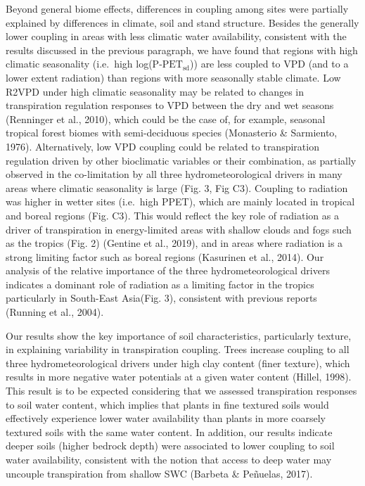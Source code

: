 \documentclass[11pt,twoside]{reedthesis}
\begin{document}
Beyond general biome effects, differences in coupling among sites were
partially explained by differences in climate, soil and stand structure.
Besides the generally lower coupling in areas with less climatic water
availability, consistent with the results discussed in the previous
paragraph, we have found that regions with high climatic seasonality
(i.e.~high log(\(\text{P-PET}_{\text{sd}}\))) are less coupled to VPD
(and to a lower extent radiation) than regions with more seasonally
stable climate. Low R2VPD under high climatic seasonality may be related
to changes in transpiration regulation responses to VPD between the dry
and wet seasons (Renninger et al., 2010), which could be the case of,
for example, seasonal tropical forest biomes with semi-deciduous species
(Monasterio \& Sarmiento, 1976). Alternatively, low VPD coupling could
be related to transpiration regulation driven by other bioclimatic
variables or their combination, as partially observed in the
co-limitation by all three hydrometeorological drivers in many areas
where climatic seasonality is large (Fig. 3, Fig C3). Coupling to
radiation was higher in wetter sites (i.e.~high PPET), which are mainly
located in tropical and boreal regions (Fig. C3). This would reflect the
key role of radiation as a driver of transpiration in energy-limited
areas with shallow clouds and fogs such as the tropics (Fig. 2) (Gentine
et al., 2019), and in areas where radiation is a strong limiting factor
such as boreal regions (Kasurinen et al., 2014). Our analysis of the
relative importance of the three hydrometeorological drivers indicates a
dominant role of radiation as a limiting factor in the tropics
particularly in South-East Asia(Fig. 3), consistent with previous
reports (Running et al., 2004).\par

Our results show the key importance of soil characteristics,
particularly texture, in explaining variability in transpiration
coupling. Trees increase coupling to all three hydrometeorological
drivers under high clay content (finer texture), which results in more
negative water potentials at a given water content (Hillel, 1998). This
result is to be expected considering that we assessed transpiration
responses to soil water content, which implies that plants in fine
textured soils would effectively experience lower water availability
than plants in more coarsely textured soils with the same water content.
In addition, our results indicate deeper soils (higher bedrock depth)
were associated to lower coupling to soil water availability, consistent
with the notion that access to deep water may uncouple transpiration
from shallow SWC (Barbeta \& Peñuelas, 2017).\par
\end{document}
